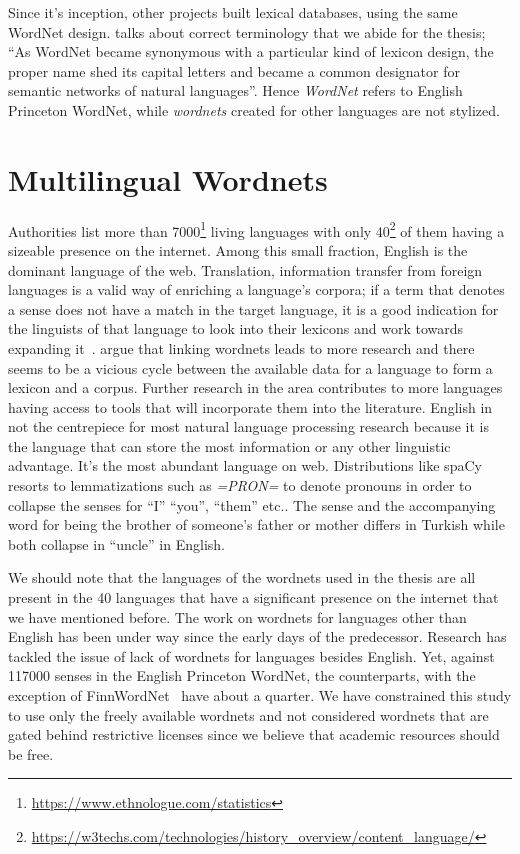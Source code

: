 Since it's inception, other projects built lexical databases, using the same WordNet design.
\textcite{fellbaum_semantic_1998} talks about correct terminology that we abide for the thesis; \enquote{As WordNet became synonymous with a particular kind of lexicon design, the proper name shed its capital letters and became a common designator for semantic networks of natural languages}.
Hence \emph{WordNet} refers to English Princeton WordNet, while \emph{wordnets} created for other languages are not stylized.

\section{Multilingual Wordnets}%
\label{sec:multilingual_wordnets}
Authorities list more than 7000\footnote{\url{https://www.ethnologue.com/statistics}} living languages with only 40\footnote{\url{https://w3techs.com/technologies/history_overview/content_language/}} of them having a sizeable presence on the internet.
Among this small fraction, English is the dominant language of the web.
Translation, information transfer from foreign languages is a valid way of enriching a language's corpora;
if a term that denotes a sense does not have a match in the target language, it is a good indication for the linguists of that language to look into their lexicons and work towards expanding it~\cite{ibrahim_usta_turkce_2006}.
\textcite{sagot_building_2008} argue that linking wordnets leads to more research and there seems to be a vicious cycle between the available data for a language to form a lexicon and a corpus.
Further research in the area contributes to more languages having access to tools that will incorporate them into the literature.
English in not the centrepiece for most natural language processing research because it is the language that can store the most information or any other linguistic advantage.
It's the most abundant language on web.
Distributions like spaCy resorts to lemmatizations such as \emph{=PRON=} to denote pronouns in order to collapse the senses for \enquote{I} \enquote{you}, \enquote{them} etc.\@.
The sense and the accompanying word for being the brother of someone's father or mother differs in Turkish while both collapse in \enquote{uncle} in English.

We should note that the languages of the wordnets used in the thesis are all present in the 40 languages that have a significant presence on the internet that we have mentioned before.
The work on wordnets for languages other than English has been under way since the early days of the predecessor.
Research has tackled the issue of lack of wordnets for languages besides English. %
Yet, against 117000 senses in the English Princeton WordNet, the counterparts, with the exception of FinnWordNet~\cite{linden_finnwordnet_2010} have about a quarter.
We have constrained this study to use only the freely available wordnets and not considered wordnets that are gated behind restrictive licenses since we believe that academic resources should be free.


